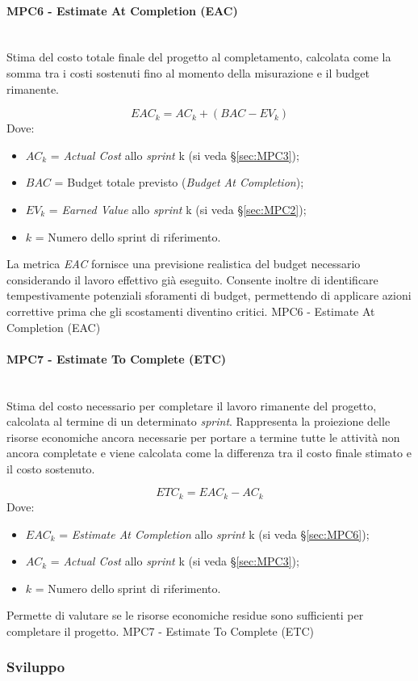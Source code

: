 \documentclass[10pt, letterpaper]{article}
\newcommand{\trisubsection}[1]{\paragraph{#1}\mbox{}\\}
\begin{document}
\trisubsection{MPC6 - Estimate At Completion (EAC)}
\label{sec:MPC6}
{Stima del costo totale finale del progetto al completamento, calcolata come la somma
    tra i costi sostenuti fino al momento della misurazione e il budget rimanente.}
{\[EAC_k = AC_k + (BAC - EV_k) \]
    Dove:
    \begin{itemize}
        \item $AC_k$ = \textit{Actual Cost} allo \textit{sprint} k (si veda §\ref{sec:MPC3});
        \item $BAC$ = Budget totale previsto (\textit{Budget At Completion});
        \item $EV_k$ = \textit{Earned Value} allo \textit{sprint} k (si veda §\ref{sec:MPC2});
        \item $k$ = Numero dello sprint di riferimento.
    \end{itemize}
}
{La metrica \textit{EAC} fornisce una previsione realistica del budget necessario
    considerando il lavoro effettivo già eseguito.
    Consente inoltre di identificare tempestivamente potenziali sforamenti di budget,
    permettendo di applicare azioni correttive prima che gli scostamenti
    diventino critici.}
{MPC6 - Estimate At Completion (EAC)}

\trisubsection{MPC7 - Estimate To Complete (ETC)}
\label{sec:MPC7}
{Stima del costo necessario per completare il lavoro rimanente del progetto,
    calcolata al termine di un determinato \textit{sprint}.
    Rappresenta la proiezione delle risorse economiche ancora necessarie per portare
    a termine tutte le attività non ancora completate e viene calcolata come la
    differenza tra il costo finale stimato e il costo sostenuto.}
{\[ ETC_k = EAC_k - AC_k \]
    Dove:
    \begin{itemize}
        \item $EAC_k$ = \textit{Estimate At Completion} allo \textit{sprint} k (si veda §\ref{sec:MPC6});
        \item $AC_k$ = \textit{Actual Cost} allo \textit{sprint} k (si veda §\ref{sec:MPC3});
        \item $k$ = Numero dello sprint di riferimento.
    \end{itemize}
}
{Permette di valutare se le risorse economiche
    residue sono sufficienti per completare il progetto.}
{MPC7 - Estimate To Complete (ETC)}

\subsubsection{Sviluppo}
\end{document}

